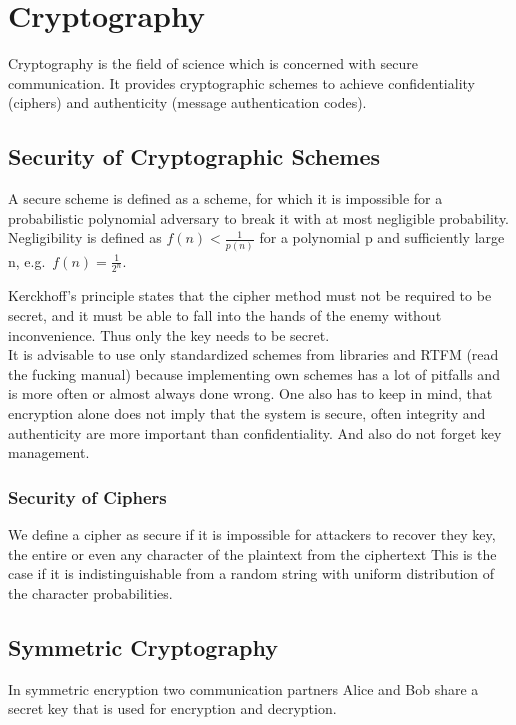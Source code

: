 
\section{Cryptography}
Cryptography is the field of science which is concerned with secure communication.
It provides cryptographic schemes to achieve confidentiality (ciphers) and authenticity (message authentication codes).

\subsection{Security of Cryptographic Schemes}
A secure scheme is defined as a scheme, for which it is impossible for a probabilistic polynomial adversary to break it with at most negligible probability.
Negligibility is defined as $f(n) < \frac{1}{p(n)}$ for a polynomial p and sufficiently large n, e.g.\ $f(n) = \frac{1}{2^n}$.

Kerckhoff's principle states that the cipher method must not be required to be secret, and it must be able to fall into the hands of the enemy without inconvenience.
Thus only the key needs to be secret.\\

It is advisable to use only standardized schemes from libraries and RTFM (read the fucking manual) because implementing own schemes has a lot of pitfalls and is more often or almost always done wrong.
One also has to keep in mind, that encryption alone does not imply that the system is secure, often integrity and authenticity are more important than confidentiality.
And also do not forget key management.

\subsubsection*{Security of Ciphers}
We define a cipher as secure if it is impossible for attackers to recover they key, the entire or even any character of the plaintext from the ciphertext 
This is the case if it is indistinguishable from a random string with uniform distribution of the character probabilities.

\subsection{Symmetric Cryptography}
In symmetric encryption two communication partners Alice and Bob share a secret key that is used for encryption and decryption.

